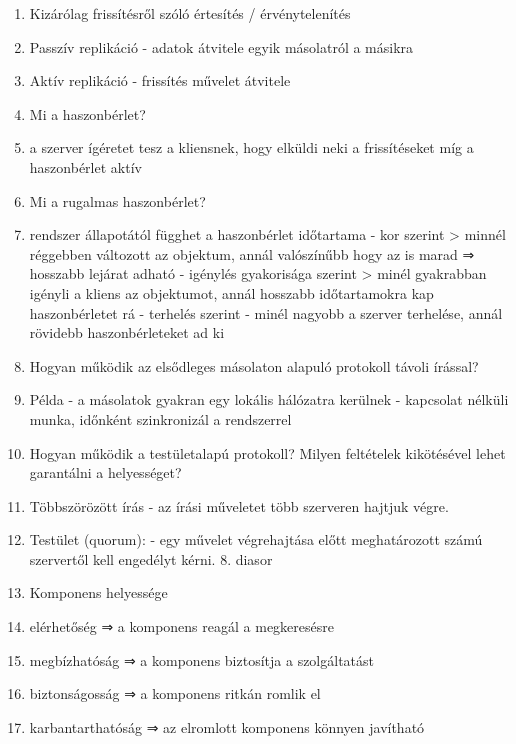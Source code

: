 \documentclass[twoside, a4paper, 12pt]{article}
\begin{document}
\begin{enumerate}
            \item Kizárólag frissítésről szóló értesítés / érvénytelenítés
            \item Passzív replikáció
                - adatok átvitele egyik másolatról a másikra
            \item Aktív replikáció
                - frissítés művelet átvitele
            \item  Mi a haszonbérlet?	
            \item a szerver ígéretet tesz a kliensnek, hogy elküldi neki a frissítéseket míg a haszonbérlet aktív
            \item  Mi a rugalmas haszonbérlet?
            \item rendszer állapotától függhet a haszonbérlet időtartama
                - kor szerint 
                > minnél réggebben változott az objektum, annál valószínűbb hogy az is marad 
                ⇒ hosszabb lejárat adható
                - igénylés gyakorisága szerint
                > minél gyakrabban igényli a kliens az objektumot, annál hosszabb időtartamokra kap haszonbérletet rá
                - terhelés szerint
                - minél nagyobb a szerver terhelése, annál rövidebb haszonbérleteket ad ki 
            \item  Hogyan működik az elsődleges másolaton alapuló protokoll távoli írással?	
            \item Példa
                - a másolatok gyakran egy lokális hálózatra kerülnek
                - kapcsolat nélküli munka, időnként szinkronizál a rendszerrel	
            \item  Hogyan működik a testületalapú protokoll? Milyen feltételek kikötésével lehet garantálni a helyességet?
            \item Többszörözött írás
                - az írási műveletet több szerveren hajtjuk végre.
            \item Testület (quorum): 
                - egy művelet végrehajtása előtt meghatározott számú szervertől kell engedélyt kérni.
                8. diasor
            \item  Komponens helyessége
            \item elérhetőség       ⇒ a komponens reagál a megkeresésre
            \item megbízhatóság     ⇒ a komponens biztosítja a szolgáltatást
            \item biztonságosság    ⇒ a komponens ritkán romlik el
            \item karbantarthatóság ⇒ az elromlott komponens könnyen javítható

\end{enumerate}
\end{document}
